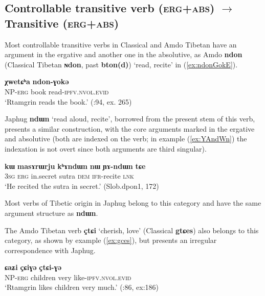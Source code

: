 \documentclass[oneside,a4paper,11pt]{article}
\newcommand{\ipa}[1]{{\phon\textbf{\mbox{#1}}}} %
\newcommand{\refb}[1]{(\ref{#1})}
\begin{document}
\subsection{Controllable transitive verb (\textsc{erg+abs})  $\rightarrow$ Transitive (\textsc{erg+abs})}
Most controllable transitive verbs in Classical and Amdo Tibetan have an argument in the ergative and another one in the absolutive, as Amdo \ipa{ndon} (Classical Tibetan \ipa{ɴdon}, past \ipa{bton(d)}) `read, recite' in \refb{ex:ndonGokE}.


\begin{exe}
\ex \label{ex:ndonGokE}
\gll \ipa{ʂtamɖʐən-ɣə}  \ipa{χwetɕʰa}  \ipa{ndon-ɣokə} \\
NP-\textsc{erg} book read-\textsc{ipfv.nvol.evid} \\
\glt `Rtamgrin reads the book.' (\citealt{haller04themchen}:94, ex. 265)
\end{exe}


Japhug \ipa{ndɯn} `read aloud, recite', borrowed from the present stem of this verb, presents a similar construction, with the core arguments marked in the ergative and absolutive (both are indexed on the verb; in example \refb{ex:YAndWn} the indexation is not overt since both arguments are third singular).

\begin{exe}
\ex \label{ex:YAndWn}
\gll \ipa{ɯʑo} 	\ipa{kɯ} 	\ipa{masɤrɯrju} 	\ipa{kʰɤndɯn} 	\ipa{nɯ} 	\ipa{ɲɤ-ndɯn} 	\ipa{tɕe} \\
\textsc{3sg} \textsc{erg} in.secret sutra \textsc{dem} \textsc{ifr}-recite \textsc{lnk} \\
\glt `He recited the sutra in secret.' (Slob.dpon1, 172)
\end{exe}

Most verbs of Tibetic origin in Japhug belong to this category and have the same argument structure as \ipa{ndɯn}. 

The Amdo Tibetan verb \ipa{çtɕi} `cherish, love' (Classical \ipa{gtɕes}) also belongs to this category, as shown by example \refb{ex:gces}, but presents an irregular correspondence with Japhug.

\begin{exe}
\ex \label{ex:gces}
\gll \ipa{ʂtamɖʐən-ɣə}  \ipa{ɕaʑi} \ipa{çɕiɣə}  \ipa{çtɕi-ɣə} \\
NP-\textsc{erg} children very like-\textsc{ipfv.nvol.evid} \\
\glt `Rtamgrin likes children very much.' (\citealt{haller04themchen}:86, ex:186)
\end{exe}
\end{document}
